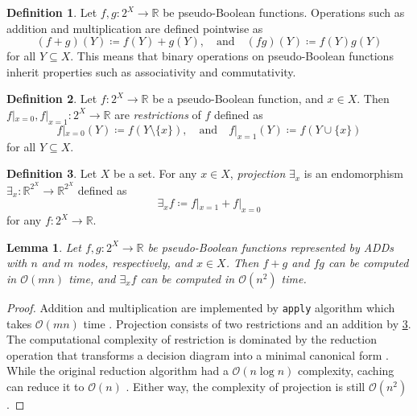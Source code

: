 \documentclass{article}
\newtheorem{lemma}{Lemma}
\theoremstyle{definition}
\newtheorem{definition}{Definition}
\theoremstyle{remark}
\begin{document}
\begin{definition} \label{def:operations}
  Let $f, g\colon 2^X \to \mathbb{R}$ be pseudo-Boolean functions. Operations
  such as addition and multiplication are defined pointwise as
  \[
    (f+g)(Y) \coloneqq f(Y)+g(Y), \quad \text{and} \quad (fg)(Y) \coloneqq
    f(Y)g(Y)
  \]
  for all $Y \subseteq X$. This means that binary operations on pseudo-Boolean
  functions inherit properties such as associativity and commutativity.
\end{definition}

\begin{definition} \label{def:restriction}
  Let $f\colon 2^X \to \mathbb{R}$ be a pseudo-Boolean function, and $x \in X$.
  Then $f|_{x=0}, f|_{x=1}\colon 2^X \to \mathbb{R}$ are \emph{restrictions} of
  $f$ defined as
  \[
    f|_{x=0}(Y) \coloneqq f(Y \setminus \{x\}), \quad \text{and} \quad
    f|_{x=1}(Y) \coloneqq f(Y \cup \{x\})
  \]
  for all $Y \subseteq X$.
\end{definition}

\begin{definition} \label{def:projection}
  Let $X$ be a set. For any $x \in X$, \emph{projection} $\exists_x$ is an
  endomorphism $\exists_x\colon \mathbb{R}^{2^X} \to \mathbb{R}^{2^X}$ defined
  as
  \[
    \exists_xf \coloneqq f|_{x=1} + f|_{x=0}
  \]
  for any $f\colon 2^X \to \mathbb{R}$.
\end{definition}

\begin{lemma} \label{lemma:basic_ops}
  Let $f,g\colon 2^X \to \mathbb{R}$ be pseudo-Boolean functions represented by
  ADDs with $n$ and $m$ nodes, respectively, and $x \in X$. Then $f+g$ and $fg$
  can be computed in $\mathcal{O}(mn)$ time, and $\exists_xf$ can be computed in
  $\mathcal{O}(n^2)$ time.
\end{lemma}
\begin{proof}
  Addition and multiplication are implemented by \texttt{apply} algorithm which
  takes $\mathcal{O}(mn)$ time \cite{DBLP:journals/tc/Bryant86}. Projection
  consists of two restrictions and an addition by \cref{def:projection}. The
  computational complexity of restriction is dominated by the reduction
  operation that transforms a decision diagram into a minimal canonical form
  \cite{DBLP:journals/tc/Bryant86}. While the original reduction algorithm had a
  $\mathcal{O}(n \log n)$ complexity, caching can reduce it to $\mathcal{O}(n)$
  \cite{somenzi1998cudd}. Either way, the complexity of projection is still
  $\mathcal{O}(n^2)$.
\end{proof}
\end{document}
